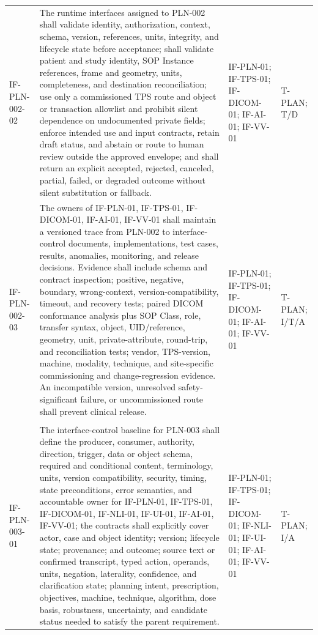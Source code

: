 \documentclass[11pt,letterpaper]{article}
\begin{document}
\begin{scriptsize}
\begin{longtable}{@{}L{0.14\textwidth}L{0.49\textwidth}L{0.19\textwidth}L{0.10\textwidth}@{}}
\mbox{IF-PLN-002-02} & The runtime interfaces assigned to PLN-002 shall validate identity, authorization, context, schema, version, references, units, integrity, and lifecycle state before acceptance; shall validate patient and study identity, SOP Instance references, frame and geometry, units, completeness, and destination reconciliation; use only a commissioned TPS route and object or transaction allowlist and prohibit silent dependence on undocumented private fields; enforce intended use and input contracts, retain draft status, and abstain or route to human review outside the approved envelope; and shall return an explicit accepted, rejected, canceled, partial, failed, or degraded outcome without silent substitution or fallback. & IF-PLN-01; IF-TPS-01; IF-DICOM-01; IF-AI-01; IF-VV-01 & T-PLAN; T\slash\allowbreak{}D \\
\addlinespace[2pt]
\mbox{IF-PLN-002-03} & The owners of IF-PLN-01, IF-TPS-01, IF-DICOM-01, IF-AI-01, IF-VV-01 shall maintain a versioned trace from PLN-002 to interface-control documents, implementations, test cases, results, anomalies, monitoring, and release decisions. Evidence shall include schema and contract inspection; positive, negative, boundary, wrong-context, version-compatibility, timeout, and recovery tests; paired DICOM conformance analysis plus SOP Class, role, transfer syntax, object, UID\slash\allowbreak{}reference, geometry, unit, private-attribute, round-trip, and reconciliation tests; vendor, TPS-version, machine, modality, technique, and site-specific commissioning and change-regression evidence. An incompatible version, unresolved safety-significant failure, or uncommissioned route shall prevent clinical release. & IF-PLN-01; IF-TPS-01; IF-DICOM-01; IF-AI-01; IF-VV-01 & T-PLAN; I\slash\allowbreak{}T\slash\allowbreak{}A \\
\addlinespace[2pt]
 \\
\addlinespace[2pt]
\mbox{IF-PLN-003-01} & The interface-control baseline for PLN-003 shall define the producer, consumer, authority, direction, trigger, data or object schema, required and conditional content, terminology, units, version compatibility, security, timing, state preconditions, error semantics, and accountable owner for IF-PLN-01, IF-TPS-01, IF-DICOM-01, IF-NLI-01, IF-UI-01, IF-AI-01, IF-VV-01; the contracts shall explicitly cover actor, case and object identity; version; lifecycle state; provenance; and outcome; source text or confirmed transcript, typed action, operands, units, negation, laterality, confidence, and clarification state; planning intent, prescription, objectives, machine, technique, algorithm, dose basis, robustness, uncertainty, and candidate status needed to satisfy the parent requirement. & IF-PLN-01; IF-TPS-01; IF-DICOM-01; IF-NLI-01; IF-UI-01; IF-AI-01; IF-VV-01 & T-PLAN; I\slash\allowbreak{}A \\

\end{longtable}
\end{scriptsize}
\end{document}
